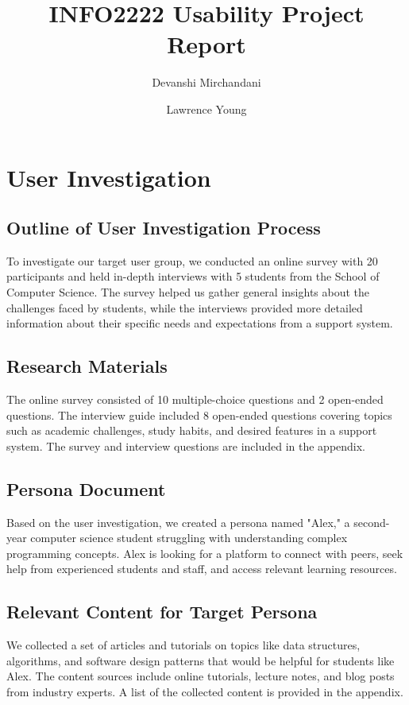 \documentclass[12pt]{article}
\begin{document}
\title{INFO2222 Usability Project Report}
\author{Devanshi Mirchandani \and Lawrence Young}
\date{}
\maketitle

\tableofcontents

\newpage
\section{User Investigation}
\subsection{Outline of User Investigation Process}
To investigate our target user group, we conducted an online survey with 20 participants and held in-depth interviews with 5 students from the School of Computer Science. The survey helped us gather general insights about the challenges faced by students, while the interviews provided more detailed information about their specific needs and expectations from a support system.

\subsection{Research Materials}
The online survey consisted of 10 multiple-choice questions and 2 open-ended questions. The interview guide included 8 open-ended questions covering topics such as academic challenges, study habits, and desired features in a support system. The survey and interview questions are included in the appendix.

\subsection{Persona Document}
Based on the user investigation, we created a persona named "Alex," a second-year computer science student struggling with understanding complex programming concepts. Alex is looking for a platform to connect with peers, seek help from experienced students and staff, and access relevant learning resources.

\subsection{Relevant Content for Target Persona}
We collected a set of articles and tutorials on topics like data structures, algorithms, and software design patterns that would be helpful for students like Alex. The content sources include online tutorials, lecture notes, and blog posts from industry experts. A list of the collected content is provided in the appendix.
\end{document}
